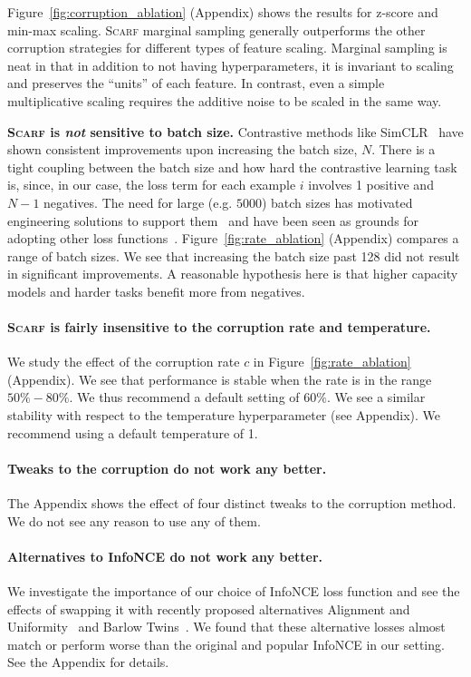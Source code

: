 Figure~\ref{fig:corruption_ablation} (Appendix) shows the results for z-score and min-max scaling. \textsc{Scarf} marginal sampling generally outperforms the other corruption strategies for different types of feature scaling. Marginal sampling is neat in that in addition to not having hyperparameters, it is invariant to scaling and preserves the ``units'' of each feature. In contrast, even a simple multiplicative scaling requires the additive noise to be scaled in the same way. 

{\bf \textsc{Scarf} is \emph{not} sensitive to batch size.} Contrastive methods like SimCLR~\citep{chen2020simple} have shown consistent improvements upon increasing the batch size, $N$. There is a tight coupling between the batch size and how hard the contrastive learning task is, since, in our case, the loss term for each example $i$ involves 1 positive and $N-1$ negatives. The need for large (e.g. $5000$) batch sizes has motivated engineering solutions to support them~\citep{gao2021scaling} and have been seen as grounds for adopting other loss functions~\citep{zbontar2021barlow}. Figure~\ref{fig:rate_ablation} (Appendix) compares a range of batch sizes. We see that increasing the batch size past 128 did not result in significant improvements. A reasonable hypothesis here is that higher capacity models and harder tasks benefit more from negatives.

 \paragraph{\textsc{Scarf} is fairly insensitive to the corruption rate and temperature.} We study the effect of the corruption rate $c$ in Figure~\ref{fig:rate_ablation} (Appendix). We see that performance is stable when the rate is in the range $50\% - 80\%$. We thus recommend a default setting of $60\%$. We see a similar stability with respect to the temperature hyperparameter (see Appendix). We recommend using a default temperature of 1.

 \paragraph{Tweaks to the corruption do not work any better.} The Appendix shows the effect of four distinct tweaks to the corruption method. We do not see any reason to use any of them.

 \paragraph{Alternatives to InfoNCE do not work any better.} We investigate the importance of our choice of InfoNCE loss function and see the effects of swapping it with recently proposed alternatives Alignment and Uniformity~\citep{wang2020understanding} and Barlow Twins~\citep{zbontar2021barlow}. We found that these alternative losses almost match or perform worse than the original and popular InfoNCE in our setting. See the Appendix for details.

